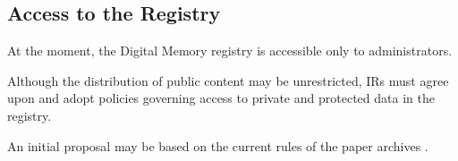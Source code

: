 \documentclass[11pt]{IEEEtran}
\begin{document}
\subsection{Access to the Registry}
At the moment, the Digital Memory registry is accessible only to administrators.

Although the distribution of public content may be unrestricted, IRs must agree upon and adopt policies governing access to private and protected data in the registry.

An initial proposal may be based on the current rules of the paper archives \cite{CERNArchiveAccessRules}.




\end{document}
